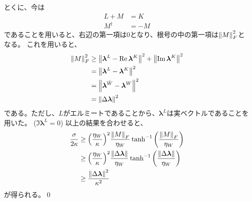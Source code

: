 \documentclass[a4paper,11pt]{jsarticle}
\numberwithin{equation}{section}
\begin{document}
とくに、今は
\begin{align}
    L + M &= K\\
    M^{\dagger} &= -M
\end{align}
であることを用いると、右辺の第一項は$0$となり、根号の中の第一項は$\norm{M}_F^2$となる。
これを用いると、
\begin{align}
    \norm{M}_F^2 &\geq \norm{\bm{\lambda}^L - \Re \bm{\lambda}^{K}}^2 + \norm{\Im \bm{\lambda}^{K}}^2\\
    &= \norm{\bm{\lambda}^{L} - \bm{\lambda}^{K}}^2\\
    &= \norm{\bm{\lambda}^{\bar{W}} - \bm{\lambda}^{W}}^2\\
    &= \norm{\Delta \bm{\lambda}}^2
\end{align}
である。ただし、$L$がエルミートであることから、$\bm{\lambda}^L$は実ベクトルであることを用いた。
($\Im \bm{\lambda}^L = 0$)
以上の結果を合わせると、
\begin{align}
    \frac{\sigma}{2\kappa} &\geq \qty(\frac{\eta_{W}}{\kappa})^2 \frac{\norm{M}_F}{\eta_{W}} \tanh^{-1} \qty(\frac{\norm{M}_F}{\eta_{W}})\\
    &\geq \qty(\frac{\eta_{W}}{\kappa})^2 \frac{\norm{\Delta \bm{\lambda}}}{\eta_{W}} \tanh^{-1} \qty(\frac{\norm{\Delta \bm{\lambda}}}{\eta_{W}})\\
    &\geq \frac{\norm{\Delta \bm{\lambda}}^2}{\kappa^2}
\end{align}
が得られる。\qed\\
\end{document}
